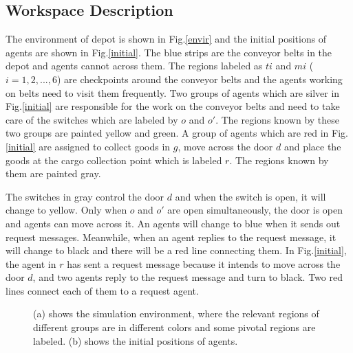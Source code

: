 \documentclass[journal]{IEEEtran}
\begin{document}
\subsection{Workspace Description}
The environment of depot is shown in Fig.\ref{envir} and the initial positions of agents are shown in Fig.\ref{initial}. The blue strips are the conveyor belts in the depot and agents cannot across them. The regions labeled as $ti$ and $mi$ ($i=1,2,...,6$) are checkpoints around the conveyor belts and the agents working on belts need to visit them frequently. Two groups of agents which are silver in Fig.\ref{initial} are responsible for the work on the conveyor belts and need to take care of the switches which are labeled by $o$ and $o'$. The regions known by these two groups are painted yellow and green. A group of agents which are red in Fig.\ref{initial} are assigned to collect goods in $g$, move across the door $d$ and place the goods at the cargo collection point which is labeled $r$. The regions known by them are painted gray.\par
The switches in gray control the door $d$ and when the switch is open, it will change to yellow. Only when $o$ and $o'$ are open simultaneously, the door is open and agents can move across it. An agents will change to blue when it sends out request messages. Meanwhile, when an agent replies to the request message, it will change to black and there will be a red line connecting them. In Fig.\ref{initial}, the agent in $r$ has sent a request message because it intends to move across the door $d$, and two agents reply to the request message and turn to black. Two red lines connect each of them to a request agent.
\begin{figure}
\centering
{}
\hspace{0.3in}
\caption{(a) shows the simulation environment, where the relevant regions of different groups are in different colors and some pivotal regions are labeled. (b) shows the initial positions of agents.}
\label{first}
\end{figure}
\end{document}
